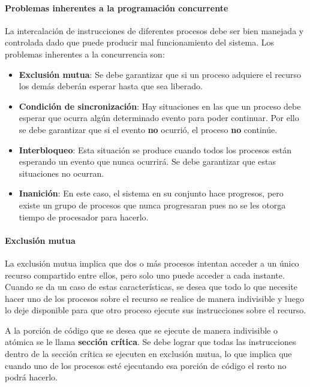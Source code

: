 \paragraph{Problemas inherentes a la programación concurrente}
La intercalación de instrucciones de diferentes procesos debe ser bien manejada y controlada dado que puede producir mal funcionamiento del sistema. Los problemas inherentes a la concurrencia son:
\begin{itemize}
    \item \textbf{Exclusión mutua}: Se debe garantizar que si un proceso adquiere el recurso los demás deberán esperar hasta que sea liberado.

    \item \textbf{Condición de sincronización}: Hay situaciones en las que un proceso debe esperar que ocurra algún determinado evento para poder continuar. Por ello se debe garantizar que si el evento \textbf{no} ocurrió, el proceso \textbf{no} continúe. 
    
    \item \textbf{Interbloqueo}: Esta situación se produce cuando todos los procesos están esperando un evento que nunca ocurrirá. Se debe garantizar que estas situaciones no ocurran.
    
    \item \textbf{Inanición}: En este caso, el sistema en su conjunto hace progresos, pero existe un grupo de procesos que nunca progresaran pues no se les otorga tiempo de procesador para hacerlo.
\end{itemize}

\paragraph{Exclusión mutua}
La exclusión mutua implica que dos o más procesos intentan acceder a un único recurso compartido entre ellos, pero solo uno puede acceder a cada instante.
Cuando se da un caso de estas características, se desea que todo lo que necesite hacer uno de los procesos sobre el recurso se realice de manera indivisible y luego lo deje disponible para que otro proceso ejecute sus instrucciones sobre el recurso.
\par A la porción de código que se desea que se ejecute de manera indivisible o atómica se le llama \textbf{sección crítica}. Se debe lograr que todas las instrucciones dentro de la sección crítica se ejecuten en exclusión mutua, lo que implica que cuando uno de los procesos esté ejecutando esa porción de código el resto no podrá hacerlo.

